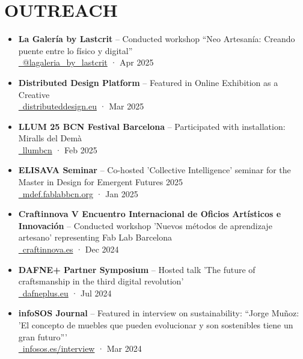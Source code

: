 \documentclass[11pt,a4paper]{article}
\begin{document}
\section*{OUTREACH}
\begin{itemize}[leftmargin=*,label={},itemsep=2pt]
    \item \textbf{La Galería by Lastcrit} -- Conducted workshop ``Neo Artesanía: Creando puente entre lo físico y digital''\\
    \href{https://www.instagram.com/p/DIePpM6ts27/?utm_source=ig_web_copy_link&igsh=MzRlODBiNWFlZA==}{\faInstagram\ @lagaleria\_by\_lastcrit} · Apr 2025
    
    \item \textbf{Distributed Design Platform} -- Featured in Online Exhibition as a Creative\\
    \href{https://distributeddesign.eu/}{\faLink\ distributeddesign.eu} · Mar 2025
    
    \item \textbf{LLUM 25 BCN Festival Barcelona} -- Participated with installation: Miralls del Demà\\
    \href{https://www.barcelona.cat/llumbcn/ca}{\faGlobe\ llumbcn} · Feb 2025
    
    \item \textbf{ELISAVA Seminar} -- Co-hosted 'Collective Intelligence' seminar for the Master in Design for Emergent Futures 2025\\
    \href{https://mdef.fablabbcn.org/}{\faUniversity\ mdef.fablabbcn.org} · Jan 2025
    
    \item \textbf{Craftinnova V Encuentro Internacional de Oficios Artísticos e Innovación} -- Conducted workshop 'Nuevos métodos de aprendizaje artesano' representing Fab Lab Barcelona\\
    \href{https://www.craftinnova.es/}{\faGlobe\ craftinnova.es} · Dec 2024
    
    \item \textbf{DAFNE+ Partner Symposium} -- Hosted talk 'The future of craftsmanship in the third digital revolution'\\
    \href{https://dafneplus.eu/}{\faGlobe\ dafneplus.eu} · Jul 2024
    
    \item \textbf{infoSOS Journal} -- Featured in interview on sustainability: ``Jorge Muñoz: 'El concepto de muebles que pueden evolucionar y son sostenibles tiene un gran futuro'''\\
    \href{https://infosos.es/jorge-munoz-el-concepto-de-muebles-que-pueden-evolucionar-y-son-sostenibles-tiene-un-gran-futuro/}{\faNewspaper[regular]\ infosos.es/interview} · Mar 2024
    

\end{itemize}
\end{document}
